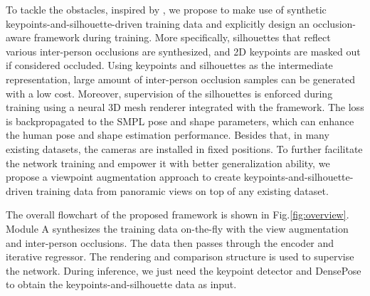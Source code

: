 \documentclass[journal]{IEEEtran}
\begin{document}
To tackle the obstacles, inspired by \cite{STRAPS2020BMVC}, we propose to make use of synthetic keypoints-and-silhouette-driven training data and explicitly design an occlusion-aware framework during training. More specifically, silhouettes that reflect various inter-person occlusions are synthesized, and 2D keypoints are masked out if considered occluded. Using keypoints and silhouettes as the intermediate representation, large amount of inter-person occlusion samples can be generated with a low cost. Moreover, supervision of the silhouettes is enforced during training using a neural 3D mesh renderer integrated with the framework. The loss is backpropagated to the SMPL pose and shape parameters, which can enhance the human pose and shape estimation performance. Besides that, in many existing datasets, the cameras are installed in fixed positions. To further facilitate the network training and empower it with better generalization ability, we propose a viewpoint augmentation approach to create keypoints-and-silhouette-driven training data from panoramic views on top of any existing dataset. 

The overall flowchart of the proposed framework is shown in Fig.\ref{fig:overview}. Module A synthesizes the training data on-the-fly with the view augmentation and inter-person occlusions. The data then passes through the encoder and iterative regressor. The rendering and comparison structure is used to supervise the network. During inference, we just need the keypoint detector \cite{he2017mask} and DensePose \cite{guler2018densepose} to obtain the keypoints-and-silhouette data as input.
\end{document}

